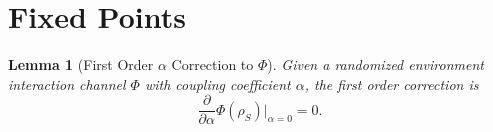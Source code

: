 \documentclass{article}
\newtheorem{lemma}[theorem]{Lemma}
\begin{document}
\section{Fixed Points}

\begin{lemma}[First Order $\alpha$ Correction to $\Phi$]
   Given a randomized environment interaction channel $\Phi$ with coupling coefficient $\alpha$, the first order correction is
   \begin{equation}
        \frac{\partial}{\partial \alpha} \Phi(\rho_S) \bigg|_{\alpha = 0} = 0.
   \end{equation}
\end{lemma}
\end{document}
